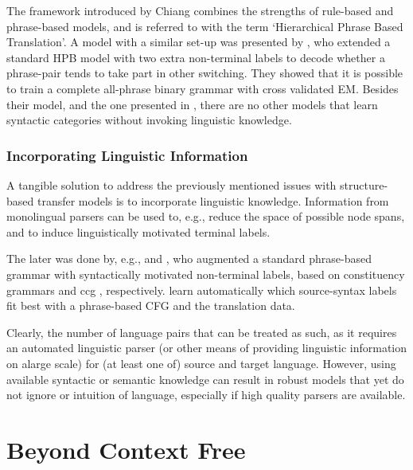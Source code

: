 \documentclass{report}
\theoremstyle{definition}
\theoremstyle{plain}
\begin{document}
The framework introduced by Chiang combines the strengths of rule-based and phrase-based models, and is referred to with the term `Hierarchical Phrase Based Translation'. A model with a similar set-up was presented by \cite{mylonakis2010learning}, who extended a standard HPB model with two extra non-terminal labels to decode whether a phrase-pair tends to take part in other switching. They showed that it is possible to train a complete all-phrase binary grammar with cross validated EM. Besides their model, and the one presented in \cite{blunsom2008bayesian}, there are no other models that learn syntactic categories without invoking linguistic knowledge.


\subsubsection{Incorporating Linguistic Information}

A tangible solution to address the previously mentioned issues with structure-based transfer models is to incorporate linguistic knowledge. Information from monolingual parsers can be used to, e.g., reduce the space of possible node spans, and to induce linguistically motivated terminal labels.

The later was done by, e.g., \cite{zollmann2006syntax} and \cite{almaghout2010ccg}, who augmented a standard phrase-based grammar with syntactically motivated non-terminal labels, based on constituency grammars and ccg \citep{steedman2011combinatory}, respectively. \cite{mylonakis2011learning} learn automatically which source-syntax labels fit best with a phrase-based CFG and the translation data.

\cite{li2013modeling}

Clearly, the number of language pairs that can be treated as such, as it requires an automated linguistic parser (or other means of providing linguistic information on alarge scale) for (at least one of) source and target language. However, using available syntactic or semantic knowledge can result in robust models that yet do not ignore or intuition of language, especially if high quality parsers are available.




\section{Beyond Context Free}
\label{sec:bcf}
\end{document}
